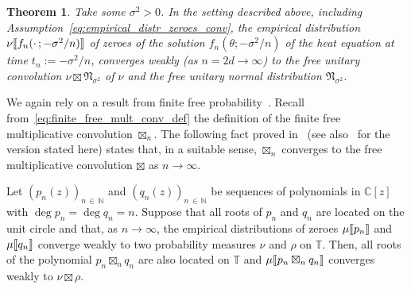 \documentclass[10pt]{amsart}
\newtheorem{theo}{Theorem}[section]
\theoremstyle{definition}\newtheorem{defi}[theo]{Definition}\newtheorem{rema}[theo]{Remark}\newtheorem{exam}[theo]{Example}\newtheorem{exem}[theo]{Example}\newtheorem{nota}[theo]{Notation}
\newcommand{\llbracket}{\mathopen{[\mkern -2.7mu[}}
\newcommand{\rrbracket}{\mathclose{]\mkern -2.7mu]}}
\newcommand{\lsem}{\llbracket}
\newcommand{\rsem}{\rrbracket}
\newcommand{\fnorm}{\mathfrak{N}}
\newcommand{\bT}{\mathbb{T}}
\newcommand{\N}{\mathbb{N}}
\newcommand{\C}{\mathbb{C}}
\begin{document}
\begin{theo}\label{theo:heat_flow_zeroes}
Take some $\sigma^2>0$. In the setting described above, including Assumption~\eqref{eq:empirical_distr_zeroes_conv}, the empirical distribution $\nu\lsem f_{n}(\cdot\,;-\sigma^2/n)\rsem$ of zeroes of the solution $f_{n}(\theta; -\sigma^2/n)$ of the heat equation at time $t_{n} := -\sigma^2/n$, converges weakly (as $n=2d\to\infty$) to the free unitary convolution $\nu \boxtimes \fnorm_{\sigma^2}$ of $\nu$ and the free unitary normal distribution $\fnorm_{\sigma^2}$.
\end{theo}

We again rely on a result from finite free probability~\cite{marcus_spielman_srivastava,marcus}. Recall from~\eqref{eq:finite_free_mult_conv_def} the definition of the finite free multiplicative convolution $\boxtimes_{n}$. The following fact proved in~\cite[Proposition~3.4]{arizmendi_garza_vargas_perales} (see also~\cite[Proposition~2.9]{kabluchko_rep_diff_free_poi} for the version stated here) states that, in a suitable sense, $\boxtimes_n$ converges to the free multiplicative convolution $\boxtimes$ as $n\to\infty$.

\begin{prop}\label{prop:finite_free_mult_conv_to_free_mult}
Let $(p_n(z))_{n\,\in\,\N}$ and $(q_n(z))_{n\,\in\,\N}$ be sequences of polynomials in $\C[z]$ with $\deg p_n = \deg q_n = n$. Suppose that all roots of $p_n$ and $q_n$ are located on the unit circle and that, as $n\to\infty$, the empirical distributions of zeroes $\mu\lsem p_{n}\rsem$ and $\mu\lsem q_{n}\rsem$ converge weakly to two probability measures $\nu$ and $\rho$ on $\bT$. Then, all roots of the polynomial $p_n \boxtimes_n q_n$ are also located on $\bT$ and $\mu \lsem p_n \boxtimes_n q_n\rsem$ converges weakly to $\nu \boxtimes \rho$.
\end{prop}
\end{document}
